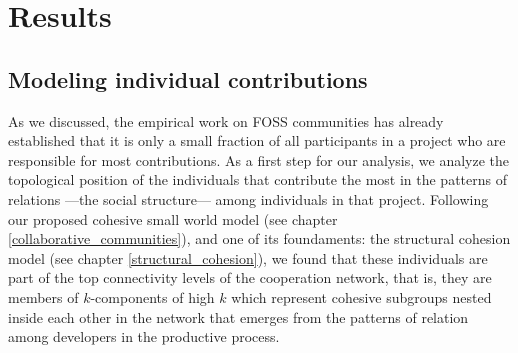 \section{Results}

\subsection{Modeling individual contributions}

As we discussed, the empirical work on FOSS communities has already established that it is only a small fraction of all participants in a project who are responsible for most contributions. As a first step for our analysis, we analyze the topological position of the individuals that contribute the most in the patterns of relations ---the social structure--- among individuals in that project. Following our proposed cohesive small world model (see chapter \ref{collaborative_communities}), and one of its foundaments: the structural cohesion model \citep{moody:2003} (see chapter \ref{structural_cohesion}), we found that these individuals are part of the top connectivity levels of the cooperation network, that is, they are members of $k$-components of high $k$ which represent cohesive subgroups nested inside each other in the network that emerges from the patterns of relation among developers in the productive process. 


